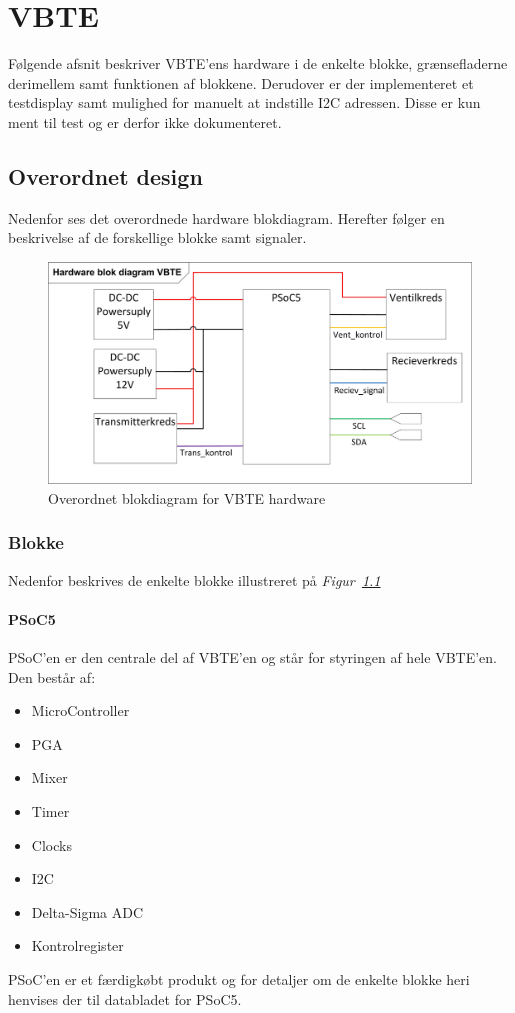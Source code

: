\chapter{VBTE}
Følgende afsnit beskriver VBTE'ens hardware i de enkelte blokke, grænsefladerne derimellem samt funktionen af blokkene. Derudover er der implementeret et testdisplay samt mulighed for manuelt at indstille I2C adressen. Disse er kun ment til test og er derfor ikke dokumenteret.
\section{Overordnet design}
Nedenfor ses det overordnede hardware blokdiagram. Herefter følger en beskrivelse af de forskellige blokke samt signaler.
\begin{figure}[H]
\centering
\includegraphics[width=.85\textwidth]{billeder/HWVBTE}
\caption{Overordnet blokdiagram for VBTE hardware}
\label{fig:HWVBTE}
\end{figure}
\subsection{Blokke}
Nedenfor beskrives de enkelte blokke illustreret på \textit{Figur~\ref{fig:HWVBTE}}
\subsubsection{PSoC5}
PSoC'en er den centrale del af VBTE'en og står for styringen af hele VBTE'en. Den består af:
\begin{itemize}
\item MicroController
\item PGA
\item Mixer
\item Timer
\item Clocks
\item I2C
\item Delta-Sigma ADC
\item Kontrolregister
\end{itemize}
PSoC'en er et færdigkøbt produkt og for detaljer om de enkelte blokke heri henvises der til databladet for PSoC5.
